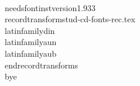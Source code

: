 \
\\needsfontinstversion{1.933}
\\recordtransforms{tud-cd-fonts-rec.tex}
\\latinfamily{din}{}
\\latinfamily{aun}{}
\\latinfamily{aub}{}
\\endrecordtransforms
\\bye

